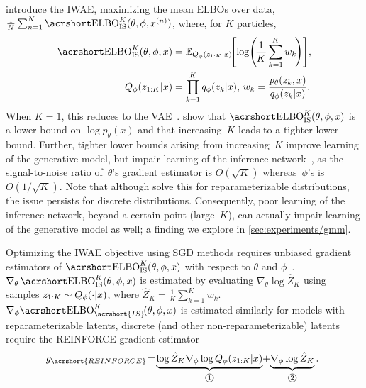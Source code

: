 \citet{Burda2016importance} introduce the \gls{IWAE}, maximizing the mean \glspl{ELBO} over data, $\frac{1}{N} \sum_{n = 1}^N \ELBO_{\text{IS}}^K(\theta, \phi, x^{(n)})$, where, for $K$ particles,
\begin{align}
  \label{eq:elbo_is}
  \ELBO_{\text{IS}}^K(\theta, \phi, x)
  &= \E_{Q_\phi(z_{1:K} \given x)}
    \!\!\left[ \log\!\left(\!\frac{1}{K} \sum_{k = 1}^K w_k \!\right)\right]\!,\\
  Q_\phi(z_{1:K} \given x)
  &= \prod_{k = 1}^K q_\phi(z_k \given x), \,w_k = \frac{p_\theta(z_k, x)}{q_\phi(z_k \given x)}.
  \nonumber
\end{align}
When $K = 1$, this reduces to the \gls{VAE}~\citep{Kingma2014auto,Rezende2014stochastic}.
\citet{Burda2016importance} show that $\ELBO_{\text{IS}}^K(\theta, \phi, x)$ is a lower bound on $\log p_\theta(x)$ and that increasing~$K$ leads to a tighter lower bound.
%
Further, tighter lower bounds arising from increasing~$K$ improve learning of the generative model, but impair learning of the inference network~\citep{Rainforth2018tighter}, as the signal-to-noise ratio of~\(\theta\)'s gradient estimator is $O(\sqrt{K})$ whereas~\(\phi\)'s is $O(1 / \sqrt{K})$.
%
Note that although \citet{Tucker2019doubly} solve this for reparameterizable distributions, the issue persists for discrete distributions.
%
Consequently, poor learning of the inference network, beyond a certain point (large~\(K\)), can actually impair learning of the generative model as well; a finding we explore in \cref{sec:experiments/gmm}.

Optimizing the \gls{IWAE} objective using \gls{SGD} methods requires unbiased gradient estimators of $\ELBO_{\text{IS}}^K(\theta, \phi, x)$ with respect to $\theta$ and $\phi$~\citep{Robbins1951stochastic}.
%
$\nabla_\theta \ELBO_{\text{IS}}^K(\theta, \phi, x)$ is estimated by evaluating $\nabla_\theta \log \hat Z_K$ using samples $z_{1:K} \sim Q_\phi(\cdot \lvert x)$, where $\hat Z_K = \frac{1}{K} \sum_{k = 1}^K\! w_k$.
$\nabla_\phi \!\ELBO_{\acrshort{IS}}^K\!(\theta, \phi, x)$ is estimated similarly for models with reparameterizable latents, discrete (and other non-reparameterizable) latents require the \acrshort{REINFORCE} gradient estimator~\citep{Williams1992simple}
\begin{align}
  \!\!\!\!g_{\acrshort{REINFORCE}}
  \!=\! \underbrace{\log \hat Z_K \nabla_\phi \log Q_\phi(z_{1:K} \given x)}_{\circled[5]{1}}
  \!+\! \underbrace{\nabla_\phi \log \hat Z_K}_{\circled[5]{2}}.\!\!
    \label{eq:iwae-reinforce}
\end{align}

